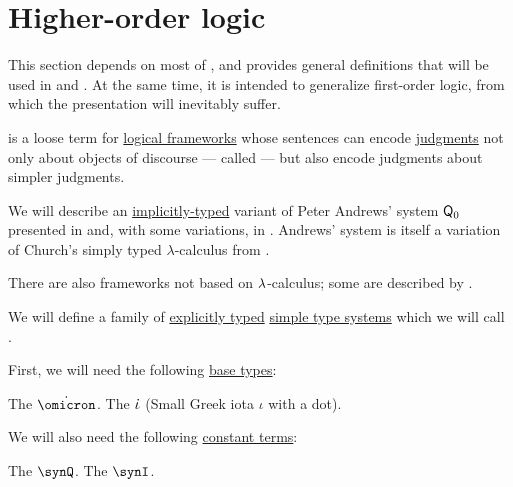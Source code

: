 \section{Higher-order logic}\label{sec:higher_order_logic}

This section depends on most of , and provides general definitions that will be used in  and . At the same time, it is intended to generalize first-order logic, from which the presentation will inevitably suffer.

\begin{concept}\label{con:higher_order_logic}
   is a loose term for \hyperref[def:logical_framework]{logical frameworks} whose sentences can encode \hyperref[con:judgment]{judgments} not only about objects of discourse --- called  --- but also encode judgments about simpler judgments.

  We will describe an \hyperref[con:explicit_and_implicit_typing]{implicitly-typed} variant of Peter Andrews' system \( \textsf{Q}_0 \) presented in \cite[\S 51]{Andrews2002STT} and, with some variations, in . Andrews' system is itself a variation of Church's simply typed \( \lambda \)-calculus from \cite{Church1940STT}.

  There are also frameworks not based on \( \mathrm{\lambda} \)-calculus; some are described by .
\end{concept}

\begin{definition}\label{def:simply_typed_hol}\mimprovised
  We will define a family of \hyperref[def:lambda_term_typing_style]{explicitly typed} \hyperref[def:simple_type_system]{simple type systems} which we will call .

  First, we will need the following \hyperref[def:simple_type]{base types}:
  \begin{thmenum}[series=def:simple_type_system/base]
     The  \( \syn\omicron \).
     The  \( \dot{\iota} \) (Small Greek iota \( \iota \) with a dot).
  \end{thmenum}

  We will also need the following \hyperref[def:lambda_term]{constant terms}:
  \begin{thmenum}
     The  \( \synQ \).
     The  \( \synI \).
  \end{thmenum}
\end{definition}

\begin{definition}\label{def:nth_order_logic}
\end{definition}
